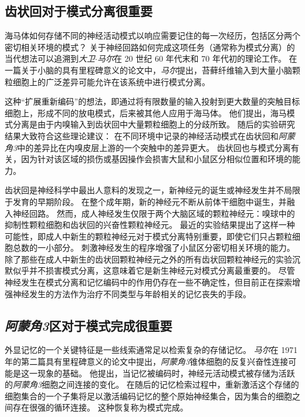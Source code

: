 \subsection{齿状回对于模式分离很重要}

海马体如何存储不同的神经活动模式以响应需要记住的每一次经历，包括区分两个密切相关环境的模式？
关于神经回路如何完成这项任务（通常称为模式分离）的当代想法可以追溯到\textit{大卫$\cdot$马尔}在 20 世纪 60 年代末和 70 年代初的理论工作。
在一篇关于小脑的具有里程碑意义的论文中，\textit{马尔}提出，苔藓纤维输入到大量小脑颗粒细胞上的广泛差异可能允许在该系统中进行模式分离。


这种“扩展重新编码”的想法，即通过将有限数量的输入投射到更大数量的突触目标细胞上，形成不同的放电模式，后来被其他人应用于海马体。
他们提出，海马模式分离是由于内嗅输入到齿状回中大量颗粒细胞上的分歧所致。
随后的实验研究结果大致符合这些理论建议：
在不同环境中记录的神经活动模式在齿状回和\textit{阿蒙角3}中的差异比在内嗅皮层上游的一个突触中的差异更大。
齿状回也与模式分离有关，因为针对该区域的损伤或基因操作会损害大鼠和小鼠区分相似位置和环境的能力。


齿状回是神经科学中最出人意料的发现之一，新神经元的诞生或神经发生并不局限于发育的早期阶段。
在整个成年期，新的神经元不断从前体干细胞中诞生，并融入神经回路。
然而，成人神经发生仅限于两个大脑区域的颗粒神经元：嗅球中的抑制性颗粒细胞和齿状回的兴奋性颗粒神经元。
最近的实验结果提出了这样一种可能性，即成人中新生的颗粒神经元对于模式分离特别重要，即使它们只占颗粒细胞总数的一小部分。
刺激神经发生的程序增强了小鼠区分密切相关环境的能力。
除了那些在成人中新生的齿状回颗粒神经元之外的所有齿状回颗粒神经元的实验沉默似乎并不损害模式分离，这意味着它是新生神经元对模式分离最重要的。
尽管神经发生在模式分离和记忆编码中的作用仍存在一些不确定性，但目前正在探索增强神经发生的方法作为治疗不同类型与年龄相关的记忆丧失的手段。



\subsection{\textit{阿蒙角3}区对于模式完成很重要}

外显记忆的一个关键特征是一些线索通常足以检索复杂的存储记忆。
\textit{马尔}在 1971 年的第二篇具有里程碑意义的论文中提出，\textit{阿蒙角3}锥体细胞的反复兴奋性连接可能是这一现象的基础。
他提出，当记忆被编码时，神经元活动模式被存储为活跃的\textit{阿蒙角3}细胞之间连接的变化。
在随后的记忆检索过程中，重新激活这个存储的细胞集合的一个子集将足以激活编码记忆的整个原始神经集合，因为集合的细胞之间存在很强的循环连接。
这种恢复称为模式完成。



